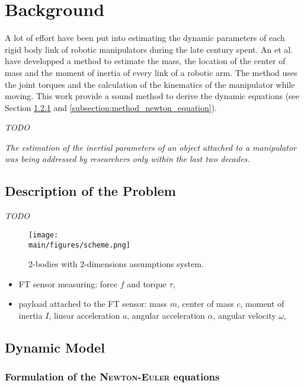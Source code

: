 \documentclass[/home/francois/latex/report/main.tex]{subfiles}
\begin{document}
\chapter{Background}
\label{chapter:background}

A lot of effort have been put into estimating the dynamic parameters of each rigid body link of robotic manipulators during the late century spent. An et al. \cite{An1985} have developped a method to estimate the mass, the location of the center of mass and the moment of inertia of every link of a robotic arm. The method uses the joint torques and the calculation of the kinematics of the manipulator while moving. This work provide a sound method to derive the dynamic equations (see Section \ref{subsection:background_newton_equation} and \ref{subsection:method_newton_equation}).

\textit{TODO}

{\it
The estimation of the inertial parameters of an object attached to a manipulator was being addressed by researchers only within the last two decades.
}

\section{Description of the Problem}
\label{section:description}

\textit{TODO}

\begin{figure}[H]
  \centering
  \texttt{[image: \\main/figures/scheme.png]}
  \caption{2-bodies with 2-dimensions assumptions system.}
  \label{fig:background:payload_sensor}
\end{figure}

\begin{itemize}
 \item \ac{FT} sensor measuring: force $f$ and torque $\tau$,
 \item payload attached to the \ac{FT} sensor: mass $m$, center of mass $c$, moment of inertia $I$, linear acceleration $a$, angular acceleration $\alpha$, angular velocity $\omega$,
\end{itemize}

\section{Dynamic Model}

\subsection{Formulation of the \textsc{Newton-Euler} equations}
\label{subsection:background_newton_equation}
\end{document}

